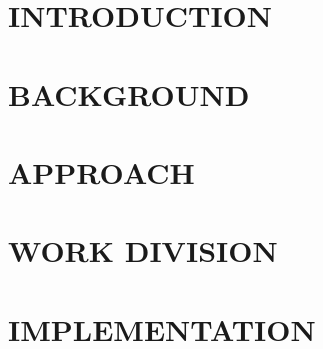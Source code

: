 \documentclass[Dual]{iitddiss}
\begin{document}
\abstract

\pagebreak


\begin{singlespace}
\tableofcontents
\thispagestyle{empty}

\listoftables
{}
\listoffigures
{}
\end{singlespace}
\pagebreak


\chapter{INTRODUCTION}
\label{chap:intro}

\pagebreak

\chapter{BACKGROUND}
\label{chap:background}

\pagebreak

\chapter{APPROACH}
\label{chap:approach}

\pagebreak

\chapter{WORK DIVISION}
\label{chap:work}

\pagebreak

\chapter{IMPLEMENTATION}
\label{chap:implementation}

\pagebreak

\end{document}
